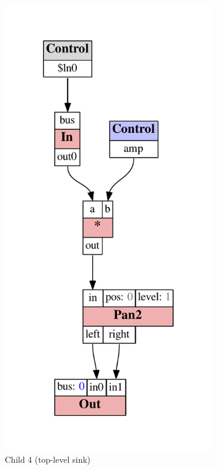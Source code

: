 \documentclass[11pt,a4paper]{article}
\begin{document}
\begin{figure}
\begin{subfigure}[b]{0.3\textwidth}
\includegraphics[scale=0.5]{figures/ugen-if-mod-child_4.pdf}
\caption{Child 4 (top-level sink)}\label{fig:ugen-mod-c4}
\end{subfigure}
\begin{subfigure}[b]{0.3\textwidth}%

\end{subfigure}
\end{figure}
\end{document}
